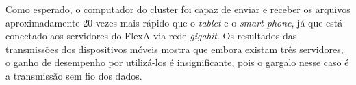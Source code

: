     Como esperado, o computador do cluster foi capaz de enviar e receber os arquivos aproximadamente 20 vezes mais rápido que o \textit{tablet} e o \textit{smart-phone}, já que está conectado aos servidores do FlexA via rede \textit{gigabit}. Os resultados das transmissões dos dispositivos móveis mostra que embora existam três servidores, o ganho de desempenho por utilizá-los é insignificante, pois o gargalo nesse caso é a transmissão sem fio dos dados.